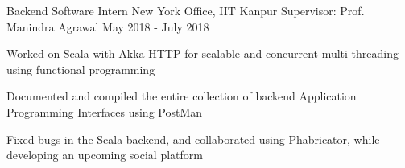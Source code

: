 
\begin{cventries}

  \cventry
    {Backend Software Intern}
    {New York Office, IIT Kanpur}
    {Supervisor: Prof. Manindra Agrawal}
    {May 2018 - July 2018}
    {
      \begin{cvitems}
        \item{Worked on Scala with Akka-HTTP for scalable and concurrent multi threading using functional programming}
        \item{Documented and compiled the entire collection of backend Application Programming Interfaces using PostMan}
        \item{Fixed bugs in the Scala backend, and collaborated using Phabricator, while developing an upcoming social platform}
      \end{cvitems}
    }

\end{cventries}
